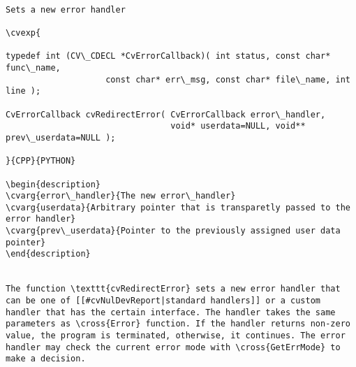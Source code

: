 \begin{verbatim}

Sets a new error handler

\cvexp{

typedef int (CV\_CDECL *CvErrorCallback)( int status, const char* func\_name,
                    const char* err\_msg, const char* file\_name, int line );

CvErrorCallback cvRedirectError( CvErrorCallback error\_handler,
                                 void* userdata=NULL, void** prev\_userdata=NULL );

}{CPP}{PYTHON}

\begin{description}
\cvarg{error\_handler}{The new error\_handler}
\cvarg{userdata}{Arbitrary pointer that is transparetly passed to the error handler}
\cvarg{prev\_userdata}{Pointer to the previously assigned user data pointer}
\end{description}


The function \texttt{cvRedirectError} sets a new error handler that can be one of [[#cvNulDevReport|standard handlers]] or a custom handler that has the certain interface. The handler takes the same parameters as \cross{Error} function. If the handler returns non-zero value, the program is terminated, otherwise, it continues. The error handler may check the current error mode with \cross{GetErrMode} to make a decision.


\end{verbatim}
\label{cvNulDevReport cvStdErrReport cvGuiBoxReport}
